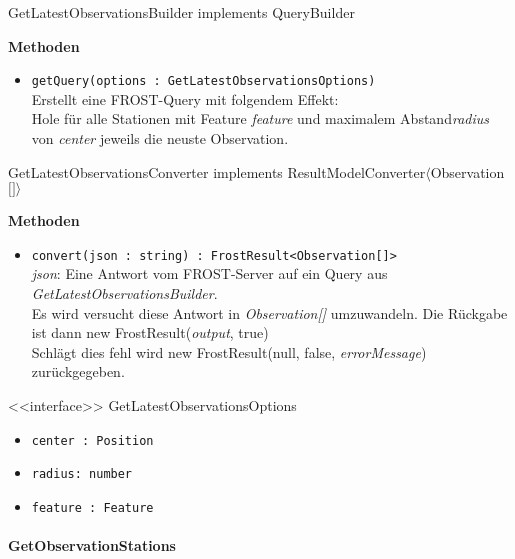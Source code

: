 \begin{Class}{GetLatestObservationsBuilder implements QueryBuilder}

    \textbf{Methoden}
    \begin{itemize}
        \item \texttt{getQuery(options : GetLatestObservationsOptions)}
        \\ Erstellt eine FROST-Query mit folgendem Effekt:
        \\ Hole für alle Stationen mit Feature \emph{feature} und maximalem Abstand\emph{radius} von \emph{center}
        jeweils die neuste Observation. 
    \end{itemize}
\end{Class}

\begin{Class}{GetLatestObservationsConverter implements ResultModelConverter$\langle$Observation$\lbrack\rbrack\rangle$}

    \textbf{Methoden}
    \begin{itemize}
        \item \texttt{convert(json : string) : FrostResult<Observation[]>}
        \\ \emph{json}: Eine Antwort vom FROST-Server auf ein Query aus \emph{GetLatestObservationsBuilder}.
        \\ Es wird versucht diese Antwort in \emph{Observation[]} umzuwandeln.
        Die Rückgabe ist dann new FrostResult(\emph{output}, true)
        \\ Schlägt dies fehl wird new FrostResult(null, false, \emph{errorMessage}) zurückgegeben.
    \end{itemize}
\end{Class}

\begin{Class}{<<interface>> GetLatestObservationsOptions}
    \begin{itemize}
        \item \texttt{center : Position}
        \item \texttt{radius: number}
        \item \texttt{feature : Feature}
    \end{itemize}
\end{Class}
\paragraph{GetObservationStations}\mbox{}\\

